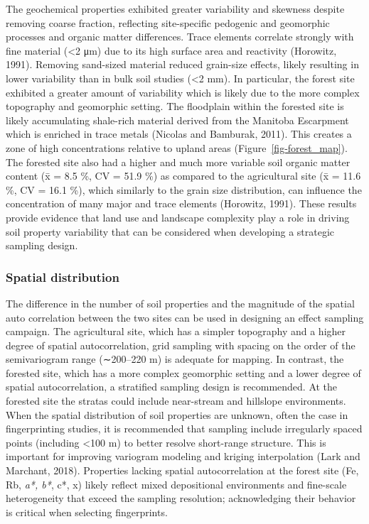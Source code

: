 \documentclass[
  number]{elsarticle}
\begin{document}
The geochemical properties exhibited greater variability and skewness
despite removing coarse fraction, reflecting site-specific pedogenic and
geomorphic processes and organic matter differences. Trace elements
correlate strongly with fine material (\textless2 μm) due to its high
surface area and reactivity (Horowitz, 1991). Removing sand-sized
material reduced grain-size effects, likely resulting in lower
variability than in bulk soil studies (\textless2 mm). In particular,
the forest site exhibited a greater amount of variability which is
likely due to the more complex topography and geomorphic setting. The
floodplain within the forested site is likely accumulating shale-rich
material derived from the Manitoba Escarpment which is enriched in trace
metals (Nicolas and Bamburak, 2011). This creates a zone of high
concentrations relative to upland areas (Figure~\ref{fig-forest_map}).
The forested site also had a higher and much more variable soil organic
matter content (x̄ = 8.5 \%, CV = 51.9 \%) as compared to the
agricultural site (x̄ = 11.6 \%, CV = 16.1 \%), which similarly to the
grain size distribution, can influence the concentration of many major
and trace elements (Horowitz, 1991). These results provide evidence that
land use and landscape complexity play a role in driving soil property
variability that can be considered when developing a strategic sampling
design.

\subsubsection{Spatial distribution}\label{spatial-distribution}

The difference in the number of soil properties and the magnitude of the
spatial auto correlation between the two sites can be used in designing
an effect sampling campaign. The agricultural site, which has a simpler
topography and a higher degree of spatial autocorrelation, grid sampling
with spacing on the order of the semivariogram range (∼200--220 m) is
adequate for mapping. In contrast, the forested site, which has a more
complex geomorphic setting and a lower degree of spatial
autocorrelation, a stratified sampling design is recommended. At the
forested site the stratas could include near-stream and hillslope
environments. When the spatial distribution of soil properties are
unknown, often the case in fingerprinting studies, it is recommended
that sampling include irregularly spaced points (including \textless100
m) to better resolve short-range structure. This is important for
improving variogram modeling and kriging interpolation (Lark and
Marchant, 2018). Properties lacking spatial autocorrelation at the
forest site (Fe, Rb, \emph{a*, b*}, c*, x) likely reflect mixed
depositional environments and fine-scale heterogeneity that exceed the
sampling resolution; acknowledging their behavior is critical when
selecting fingerprints.
\end{document}
